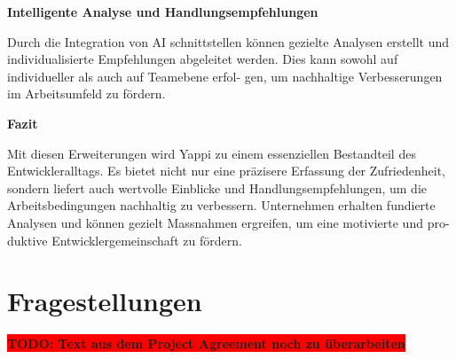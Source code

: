 \documentclass[12pt,a4paper]{report}
\newcommand{\todo}[1]{\colorbox{red}{\textbf{TODO: #1}}\\}
\begin{document}
\textbf{Intelligente Analyse und Handlungsempfehlungen}

Durch die Integration von AI schnittstellen können gezielte Analysen erstellt und individualisierte
Empfehlungen abgeleitet werden. Dies kann sowohl auf individueller als auch auf Teamebene erfol-
gen, um nachhaltige Verbesserungen im Arbeitsumfeld zu fördern.

\textbf{Fazit}

Mit diesen Erweiterungen wird Yappi zu einem essenziellen Bestandteil des Entwickleralltags. Es
bietet nicht nur eine präzisere Erfassung der Zufriedenheit, sondern liefert auch wertvolle Einblicke
und Handlungsempfehlungen, um die Arbeitsbedingungen nachhaltig zu verbessern. Unternehmen
erhalten fundierte Analysen und können gezielt Massnahmen ergreifen, um eine motivierte und pro-
duktive Entwicklergemeinschaft zu fördern.

\section{Fragestellungen}

\todo{Text aus dem Project Agreement noch zu überarbeiten}
\end{document}
